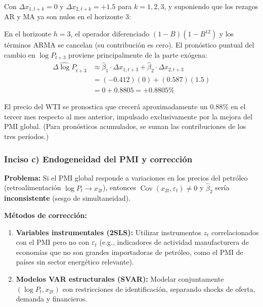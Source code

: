 \documentclass[12pt,a4paper]{article}
\DeclareMathOperator{\Cov}{Cov}
\begin{document}
\begin{solucion}
Con $\Delta x_{1,t+k}=0$ y $\Delta x_{2,t+k}=+1.5$ para $k=1,2,3$, y suponiendo que los rezagos AR y MA ya son nulos en el horizonte 3:

En el horizonte $h=3$, el operador diferenciado $(1-B)(1-B^{12})$ y los términos ARMA se cancelan (su contribución es cero). El pronóstico puntual del cambio en $\log P_{t+3}$ proviene principalmente de la parte exógena:
\begin{align*}
\widehat{\Delta\log P}_{t+3} &\approx \hat{\beta}_1\cdot\Delta x_{1,t+3} + \hat{\beta}_2\cdot\Delta x_{2,t+3}\\
&= (-0.412)(0) + (0.587)(1.5)\\
&= 0 + 0.8805 = +0.8805\%
\end{align*}

El precio del WTI se pronostica que crecerá aproximadamente un $\mathbf{0.88\%}$ en el tercer mes respecto al mes anterior, impulsado exclusivamente por la mejora del PMI global. (Para pronósticos acumulados, se suman las contribuciones de los tres períodos.)
\end{solucion}

\subsubsection*{Inciso c) Endogeneidad del PMI y corrección}

\begin{solucion}
\textbf{Problema:} Si el PMI global responde a variaciones en los precios del petróleo (retroalimentación $\log P_t\to x_{2t}$), entonces $\Cov(x_{2t},\varepsilon_t)\neq0$ y $\hat{\beta}_2$ sería \textbf{inconsistente} (sesgo de simultaneidad).

\textbf{Métodos de corrección:}
\begin{enumerate}[noitemsep]
  \item \textbf{Variables instrumentales (2SLS):} Utilizar instrumentos $z_t$ correlacionados con el PMI pero no con $\varepsilon_t$ (e.g., indicadores de actividad manufacturera de economías que no son grandes importadoras de petróleo, como el PMI de países sin sector energético relevante).
  \item \textbf{Modelos VAR estructurales (SVAR):} Modelar conjuntamente $(\log P_t, x_{2t})$ con restricciones de identificación, separando shocks de oferta, demanda y financieros.
\end{enumerate}
\end{solucion}
\end{document}

